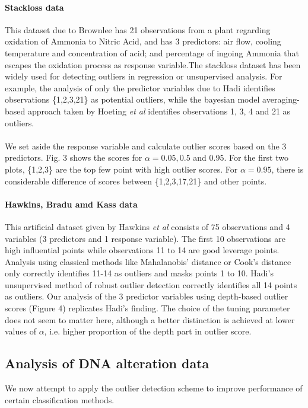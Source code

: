 \documentclass[10pt]{article}
\begin{document}
\paragraph{Stackloss data}This dataset due to Brownlee \cite{stackloss} has 21 observations from a plant regarding oxidation of Ammonia to Nitric Acid, and has 3 predictors: air flow, cooling temperature and concentration of acid; and percentage of ingoing Ammonia that escapes the oxidation process as response variable.The stackloss dataset has been widely used for detecting outliers in regression or unsupervised analysis. For example, the analysis of only the predictor variables due to Hadi \cite{hadi92} identifies observations \{1,2,3,21\} as potential outliers, while the bayesian model averaging-based approach taken by Hoeting \textit{et al}\cite{hoeting96} identifies observations 1, 3, 4 and 21 as outliers.

\paragraph{}We set aside the response variable and calculate outlier scores based on the 3 predictors. Fig. 3 shows the scores for $\alpha = 0.05, 0.5$ and 0.95. For the first two plots, \{1,2,3\} are the top few point with high outlier scores. For $\alpha = 0.95$, there is considerable difference of scores between \{1,2,3,17,21\} and other points.

\paragraph{Hawkins, Bradu amd Kass data}This artificial dataset given by Hawkins \textit{et al} \cite{hbk} consists of 75 observations and 4 variables (3 predictors and 1 response variable). The first 10 observations are high influential points while observations 11 to 14 are good leverage points. Analysis using classical methods like Mahalanobis' distance or Cook's distance only correctly identifies 11-14 as outliers and masks points 1 to 10. Hadi's unsupervised method of robust outlier detection \cite{hadi92} correctly identifies all 14 points as outliers. Our analysis of the 3 predictor variables using depth-based outlier scores (Figure 4) replicates Hadi's finding. The choice of the tuning parameter does not seem to matter here, although a better distinction is achieved at lower values of $\alpha$, i.e. higher proportion of the depth part in outlier score.

\subsection{Analysis of DNA alteration data}We now attempt to apply the outlier detection scheme to improve performance of certain classification methods.
\end{document}
